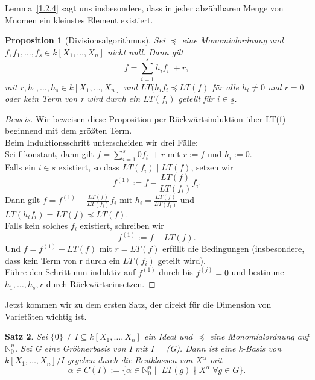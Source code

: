 \documentclass{article}
\newtheorem{satz}{Satz}
\newtheorem{proposition}[satz]{Proposition}
\newcommand*{\R}{k[X_{1},\ldots,X_{n}]}
\begin{document}
	Lemma~\ref{1.2.4} sagt uns insbesondere, dass in jeder abzählbaren Menge von Mnomen ein
	kleinstes Element existiert.
	

	\begin{proposition}[Divisionsalgorithmus] \label{1.2.5}
	Sei \(\preceq\) eine Monomialordnung und \(f, f_{1}, \ldots, f_{s} \in \R\) nicht null. Dann
	gilt \begin{displaymath} f = \sum_{i=1}^{s} h_{i}f_{i}\; + r, \end{displaymath} mit
	\(r, h_{1}, \ldots, h_{s} \in \R\) und \(LT(h_{i}f_{i} \preceq LT(f)\) für alle \(h_{i} \neq 0
	\) und \(r = 0\) oder kein Term von r wird durch ein \(LT(f_{i})\) geteilt für \(i \in
	\underline{s}\).
	\end{proposition}

	\begin{proof}[Beweis]
	Wir beweisen diese Proposition per Rückwärtsinduktion über LT(f) beginnend mit dem größten Term.\\
	Beim Induktionsschritt unterscheiden wir drei Fälle:\\
	Sei f konstant, dann gilt \(f = \sum_{i=1}^{s} 0f_{i}\; + r\) mit \(r := f\) und \(h_{i} := 0\). \\
	Falls ein \(i \in \underline{s}\) existiert, so dass \(LT(f_{i})\;| \; LT(f)\), setzen wir
	\begin{displaymath} f^{(1)} := f - \frac{LT(f)}{LT(f_{i})}f_{i}.\end{displaymath} Dann gilt
	\( f = f^{(1)} + \frac{LT(f)}{LT(f_{i})}f_{i} \) mit \(h_{i} = \frac{LT(f)}{LT(f_{i})}\) und 
	\(LT(h_{i}f_{i}) = LT(f) \preceq LT(f).\) \\
	Falls kein solches \(f_{i}\) existiert, schreiben wir \begin{displaymath} f^{(1)} := f -
	LT(f). \end{displaymath} Und \(f = f^{(1)} + LT(f)\) mit \(r = LT(f)\) erfüllt die Bedingungen 
	(insbesondere, dass kein Term von r durch ein \(LT(f_{i})\) geteilt wird). \\
	Führe den Schritt nun induktiv auf \(f^{(1)}\) durch bis \(f^{(j)} = 0\) und bestimme
	\(h_{1}, \ldots, h_{s}, r\) durch Rückwärtseinsetzen.
	\end{proof}


	Jetzt kommen wir zu dem ersten Satz, der direkt für die Dimension von Varietäten wichtig ist.

	\begin{satz} \label{1.2.8}
	Sei \(\{0\} \neq I \subseteq \R\) ein Ideal und \(\preceq\) eine Monomialordnung auf
	\(\mathbb{N}^{n}_{0}\). Sei G eine Gröbnerbasis von I mit I = (G). Dann ist eine k-Basis von 
	\(\R/I\) gegeben durch die Restklassen von \(X^{\alpha}\) mit
	\begin{displaymath}
	\alpha \in C(I) := \{\alpha \in \mathbb{N}^{n}_{0}\; |\;\; LT(g) \nmid X^{\alpha}\; \forall g 
	\in G\}.
	\end{displaymath}
	\end{satz}
\end{document}
